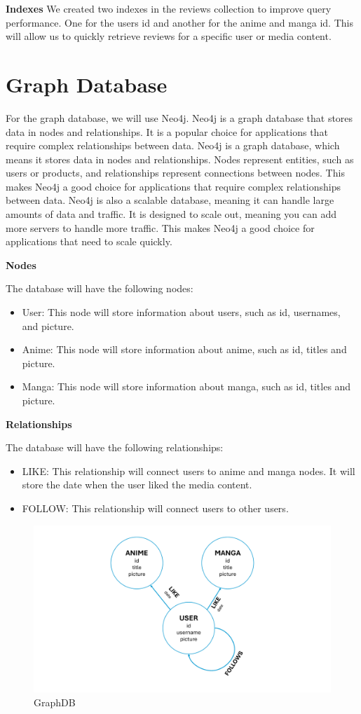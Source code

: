 \textbf{Indexes}
\newline
We created two indexes in the reviews collection to improve query performance. One for the users id and another for the anime and manga id. This will allow us to quickly retrieve reviews for a specific user or media content. 

\section{Graph Database}
For the graph database, we will use Neo4j. Neo4j is a graph database that stores data in nodes and relationships. It is a popular choice for applications that require complex relationships between data. Neo4j is a graph database, which means it stores data in nodes and relationships. Nodes represent entities, such as users or products, and relationships represent connections between nodes. This makes Neo4j a good choice for applications that require complex relationships between data. Neo4j is also a scalable database, meaning it can handle large amounts of data and traffic. It is designed to scale out, meaning you can add more servers to handle more traffic. This makes Neo4j a good choice for applications that need to scale quickly.



\textbf{Nodes}



The database will have the following nodes:
\begin{itemize}
    \item User: This node will store information about users, such as id, usernames, and picture.
    \item Anime: This node will store information about anime, such as id, titles and picture.
    \item Manga: This node will store information about manga, such as id, titles and picture.
\end{itemize}

\textbf{Relationships}


The database will have the following relationships:
\begin{itemize}
    \item LIKE: This relationship will connect users to anime and manga nodes. It will store the date when the user liked the media content.
    \item FOLLOW: This relationship will connect users to other users. 
\end{itemize}

\begin{figure}[htbp]
    \centering
    \includegraphics[width=\textwidth]{Media/graph.pdf}
    \caption{GraphDB}
    \label{fig:GraohDB}
\end{figure}
